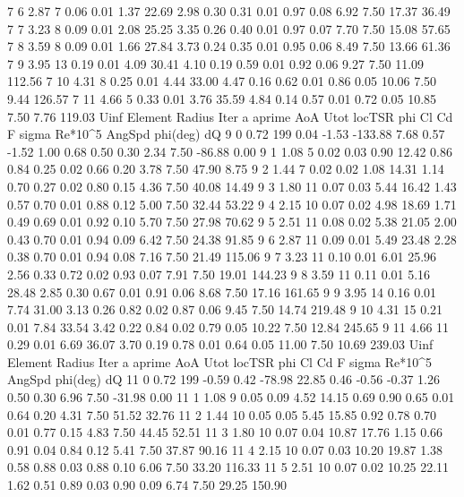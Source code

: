 \begin{pythoncode}
7  6  2.87  7  0.06  0.01  1.37  22.69  2.98  0.30  0.31  0.01  0.97  0.08  6.92  7.50  17.37  36.49
7  7  3.23  8  0.09  0.01  2.08  25.25  3.35  0.26  0.40  0.01  0.97  0.07  7.70  7.50  15.08  57.65
7  8  3.59  8  0.09  0.01  1.66  27.84  3.73  0.24  0.35  0.01  0.95  0.06  8.49  7.50  13.66  61.36
7  9  3.95  13  0.19  0.01  4.09  30.41  4.10  0.19  0.59  0.01  0.92  0.06  9.27  7.50  11.09  112.56
7  10  4.31  8  0.25  0.01  4.44  33.00  4.47  0.16  0.62  0.01  0.86  0.05  10.06  7.50  9.44  126.57
7  11  4.66  5  0.33  0.01  3.76  35.59  4.84  0.14  0.57  0.01  0.72  0.05  10.85  7.50  7.76  119.03
Uinf  Element  Radius  Iter  a  aprime  AoA  Utot  locTSR  phi  Cl  Cd  F  sigma  Re*10^5  AngSpd  phi(deg)  dQ
9  0  0.72  199  0.04  -1.53  -133.88  7.68  0.57  -1.52  1.00  0.68  0.50  0.30  2.34  7.50  -86.88  0.00
9  1  1.08  5  0.02  0.03  0.90  12.42  0.86  0.84  0.25  0.02  0.66  0.20  3.78  7.50  47.90  8.75
9  2  1.44  7  0.02  0.02  1.08  14.31  1.14  0.70  0.27  0.02  0.80  0.15  4.36  7.50  40.08  14.49
9  3  1.80  11  0.07  0.03  5.44  16.42  1.43  0.57  0.70  0.01  0.88  0.12  5.00  7.50  32.44  53.22
9  4  2.15  10  0.07  0.02  4.98  18.69  1.71  0.49  0.69  0.01  0.92  0.10  5.70  7.50  27.98  70.62
9  5  2.51  11  0.08  0.02  5.38  21.05  2.00  0.43  0.70  0.01  0.94  0.09  6.42  7.50  24.38  91.85
9  6  2.87  11  0.09  0.01  5.49  23.48  2.28  0.38  0.70  0.01  0.94  0.08  7.16  7.50  21.49  115.06
9  7  3.23  11  0.10  0.01  6.01  25.96  2.56  0.33  0.72  0.02  0.93  0.07  7.91  7.50  19.01  144.23
9  8  3.59  11  0.11  0.01  5.16  28.48  2.85  0.30  0.67  0.01  0.91  0.06  8.68  7.50  17.16  161.65
9  9  3.95  14  0.16  0.01  7.74  31.00  3.13  0.26  0.82  0.02  0.87  0.06  9.45  7.50  14.74  219.48
9  10  4.31  15  0.21  0.01  7.84  33.54  3.42  0.22  0.84  0.02  0.79  0.05  10.22  7.50  12.84  245.65
9  11  4.66  11  0.29  0.01  6.69  36.07  3.70  0.19  0.78  0.01  0.64  0.05  11.00  7.50  10.69  239.03
Uinf  Element  Radius  Iter  a  aprime  AoA  Utot  locTSR  phi  Cl  Cd  F  sigma  Re*10^5  AngSpd  phi(deg)  dQ
11  0  0.72  199  -0.59  0.42  -78.98  22.85  0.46  -0.56  -0.37  1.26  0.50  0.30  6.96  7.50  -31.98  0.00
11  1  1.08  9  0.05  0.09  4.52  14.15  0.69  0.90  0.65  0.01  0.64  0.20  4.31  7.50  51.52  32.76
11  2  1.44  10  0.05  0.05  5.45  15.85  0.92  0.78  0.70  0.01  0.77  0.15  4.83  7.50  44.45  52.51
11  3  1.80  10  0.07  0.04  10.87  17.76  1.15  0.66  0.91  0.04  0.84  0.12  5.41  7.50  37.87  90.16
11  4  2.15  10  0.07  0.03  10.20  19.87  1.38  0.58  0.88  0.03  0.88  0.10  6.06  7.50  33.20  116.33
11  5  2.51  10  0.07  0.02  10.25  22.11  1.62  0.51  0.89  0.03  0.90  0.09  6.74  7.50  29.25  150.90

\end{pythoncode}
